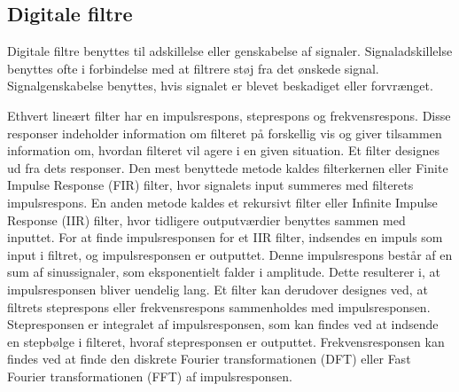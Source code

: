 \subsection{Digitale filtre}
Digitale filtre benyttes til adskillelse eller genskabelse af signaler. Signaladskillelse benyttes ofte i forbindelse med at filtrere støj fra det ønskede signal. Signalgenskabelse benyttes, hvis signalet er blevet beskadiget eller forvrænget. \citep{Smith1997}

Ethvert lineært filter har en impulsrespons, steprespons og frekvensrespons. Disse responser indeholder information om filteret på forskellig vis og giver tilsammen information om, hvordan filteret vil agere i en given situation. \citep{Smith1997} Et filter designes ud fra dets responser. Den mest benyttede metode kaldes filterkernen eller Finite Impulse Response (FIR) filter, hvor signalets input summeres med filterets impulsrespons. En anden metode kaldes et rekursivt filter eller Infinite Impulse Response (IIR) filter, hvor tidligere outputværdier benyttes sammen med inputtet. For at finde impulsresponsen for et IIR filter, indsendes en impuls som input i filtret, og impulsresponsen er outputtet. Denne impulsrespons består af en sum af sinussignaler, som eksponentielt falder i amplitude. Dette resulterer i, at impulsresponsen bliver uendelig lang. \citep{Smith1997,Blandford2013} \newline
Et filter kan derudover designes ved, at filtrets steprespons eller frekvensrespons sammenholdes med impulsresponsen. Stepresponsen er integralet af impulsresponsen, som kan findes ved at indsende en stepbølge i filteret, hvoraf stepresponsen er outputtet. Frekvensresponsen kan findes ved at finde den diskrete Fourier transformationen (DFT) eller Fast Fourier transformationen (FFT) af impulsresponsen. \citep{Smith1997} 

